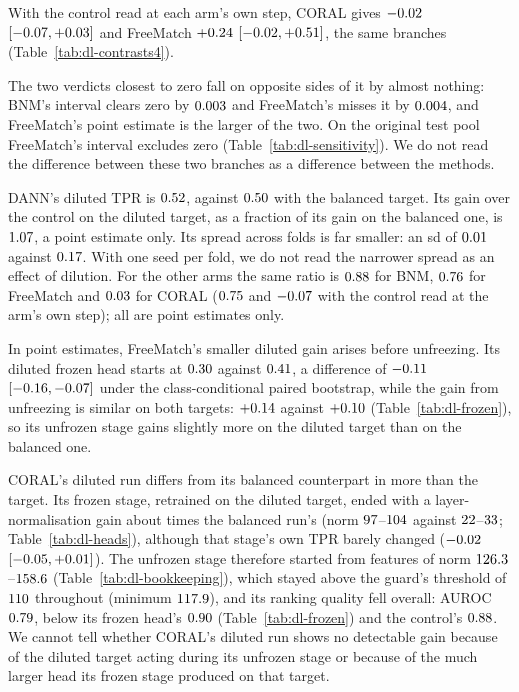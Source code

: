 \noindent With the control read at each arm's own step, CORAL gives $-0.02{}$
$[-0.07{}, +0.03{}]$ and FreeMatch $+0.24{}$ $[-0.02{}, +0.51{}]$, the
same branches (Table~\ref{tab:dl-contrasts4}).

The two verdicts closest to zero fall on opposite sides of it by almost nothing: BNM's interval
clears zero by $0.003{}$ and FreeMatch's misses it by $0.004{}$, and
FreeMatch's point estimate is the larger of the two. On the original test pool FreeMatch's
interval excludes zero (Table~\ref{tab:dl-sensitivity}). We do not read the difference between
these two branches as a difference between the methods.

DANN's diluted TPR is $0.52{}$, against $0.50{}$ with the balanced target. Its
gain over the control on the diluted target, as a fraction of its gain on the balanced one, is
$1.07{}$, a point estimate only. Its spread across folds is far smaller: an sd of
$0.01{}$ against $0.17{}$. With one seed per fold, we do not read the narrower spread
as an effect of dilution. For the other arms the same ratio is $0.88{}$ for BNM,
$0.76{}$ for FreeMatch and $0.03{}$ for CORAL ($0.75{}$ and $-0.07{}$ with
the control read at the arm's own step); all are point estimates only.

In point estimates, FreeMatch's smaller diluted gain arises before unfreezing. Its diluted frozen head starts at
$0.30{}$ against $0.41{}$, a difference of $-0.11{}$
$[-0.16{}, -0.07{}]$ under the class-conditional paired bootstrap, while
the gain from unfreezing is similar on both targets: $+0.14{}$ against
$+0.10{}$ (Table~\ref{tab:dl-frozen}), so its unfrozen stage gains slightly more
on the diluted target than on the balanced one.

CORAL's diluted run differs from its balanced counterpart in more than the target. Its frozen
stage, retrained on the diluted target, ended with a layer-normalisation gain about
\dlCoralGainRatioWord{} times the balanced run's (norm $97{}$--$104{}$
against $22{}$--$33{}$; Table~\ref{tab:dl-heads}), although that
stage's own TPR barely changed ($-0.02{}$
$[-0.05{}, +0.01{}]$). The unfrozen stage therefore started from
features of norm $126.3{}$--$158.6{}$
(Table~\ref{tab:dl-bookkeeping}), which stayed above the guard's threshold of
$110{}$ throughout (minimum $117.9{}$), and its ranking quality fell
overall: AUROC $0.79{}$, below its frozen head's $0.90{}$
(Table~\ref{tab:dl-frozen}) and the control's $0.88{}$. We cannot tell whether CORAL's diluted run shows no detectable gain
because of the diluted target acting during its unfrozen stage or because of the much larger
head its frozen stage produced on that target.

